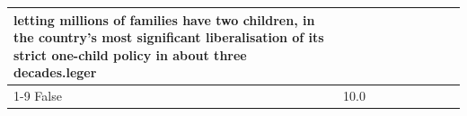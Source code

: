 \begin{table}[H]
\begin{tabular}{lllrlllll}
letting millions of families have two children, in the country's most significant liberalisation of its strict one-child policy in about three decades.leger \\
\cline{1-9}
False & 10.0%
\end{tabular}
\end{table}
